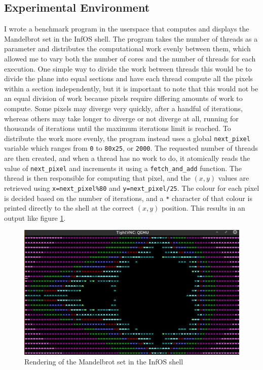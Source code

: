 \documentclass[bsc,frontabs,twoside,singlespacing,parskip,deptreport]{infthesis}     %
\begin{document}
\subsection{Experimental Environment} 
I wrote a benchmark program in the userspace that computes and displays the Mandelbrot set in the InfOS shell. The program takes the number of threads as a parameter and distributes the computational work evenly between them, which allowed me to vary both the number of cores and the number of threads for each execution. One simple way to divide the work between threads this would be to divide the plane into equal sections and have each thread compute all the pixels within a section independently, but it is important to note that this would not be an equal division of work because pixels require differing amounts of work to compute. Some pixels may diverge very quickly, after a handful of iterations, whereas others may take longer to diverge or not diverge at all, running for thousands of iterations until the maximum iterations limit is reached. To distribute the work more evenly, the program instead uses a global \verb|next_pixel| variable which ranges from \verb|0| to \verb|80x25|, or \verb|2000|. The requested number of threads are then created, and when a thread has no work to do, it atomically reads the value of \verb|next_pixel| and increments it using a \verb|fetch_and_add| function. The thread is then responsible for computing that pixel, and the $(x,y)$ values are retrieved using \verb|x=next_pixel%80| and \verb|y=next_pixel/25|. The colour for each pixel is decided based on the number of iterations, and a \verb|*| character of that colour is printed directly to the shell at the correct $(x,y)$ position. This results in an output like figure \ref{terminal-output}.

\begin{figure}[h]
    \centering
    \includegraphics[scale=0.6]{figures/terminal-output.jpg}
    \caption{Rendering of the Mandelbrot set in the InfOS shell}
    \label{terminal-output}
\end{figure}
\end{document}
